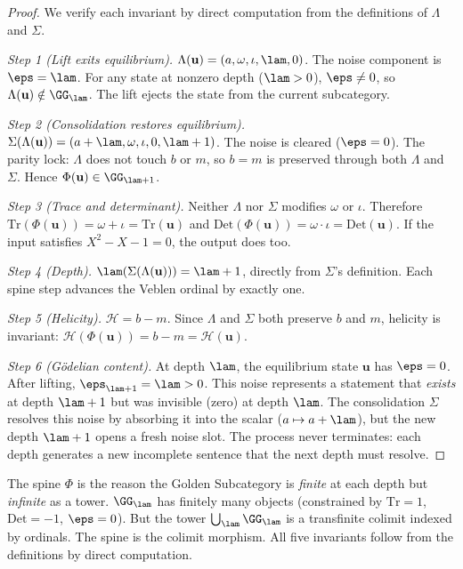 \begin{proof}
We verify each invariant by direct computation from the definitions of $\Lambda$ and $\Sigma$.

\emph{Step 1 (Lift exits equilibrium).} $\Lambda(\mathbf{u}) = (a, \omega, \iota, \lam, 0)$. The noise component is $\eps = \lam$. For any state at nonzero depth ($\lam > 0$), $\eps \neq 0$, so $\Lambda(\mathbf{u}) \notin \GG_\lam$. The lift ejects the state from the current subcategory.

\emph{Step 2 (Consolidation restores equilibrium).} $\Sigma(\Lambda(\mathbf{u})) = (a + \lam, \omega, \iota, 0, \lam + 1)$. The noise is cleared ($\eps = 0$). The parity lock: $\Lambda$ does not touch $b$ or $m$, so $b = m$ is preserved through both $\Lambda$ and $\Sigma$. Hence $\Phi(\mathbf{u}) \in \GG_{\lam+1}$.

\emph{Step 3 (Trace and determinant).} Neither $\Lambda$ nor $\Sigma$ modifies $\omega$ or $\iota$. Therefore $\mathrm{Tr}(\Phi(\mathbf{u})) = \omega + \iota = \mathrm{Tr}(\mathbf{u})$ and $\mathrm{Det}(\Phi(\mathbf{u})) = \omega \cdot \iota = \mathrm{Det}(\mathbf{u})$. If the input satisfies $X^2 - X - 1 = 0$, the output does too.

\emph{Step 4 (Depth).} $\lam(\Sigma(\Lambda(\mathbf{u}))) = \lam + 1$, directly from $\Sigma$'s definition. Each spine step advances the Veblen ordinal by exactly one.

\emph{Step 5 (Helicity).} $\mathcal{H} = b - m$. Since $\Lambda$ and $\Sigma$ both preserve $b$ and $m$, helicity is invariant: $\mathcal{H}(\Phi(\mathbf{u})) = b - m = \mathcal{H}(\mathbf{u})$.

\emph{Step 6 (G\"odelian content).} At depth $\lam$, the equilibrium state $\mathbf{u}$ has $\eps = 0$. After lifting, $\eps_{\lam+1} = \lam > 0$. This noise represents a statement that \emph{exists} at depth $\lam + 1$ but was invisible (zero) at depth $\lam$. The consolidation $\Sigma$ resolves this noise by absorbing it into the scalar ($a \mapsto a + \lam$), but the new depth $\lam + 1$ opens a fresh noise slot. The process never terminates: each depth generates a new incomplete sentence that the next depth must resolve. \qedhere
\end{proof}

\begin{remark}
The spine $\Phi$ is the reason the Golden Subcategory is \emph{finite} at each depth but \emph{infinite} as a tower. $\GG_\lam$ has finitely many objects (constrained by $\mathrm{Tr} = 1$, $\mathrm{Det} = -1$, $\eps = 0$). But the tower $\bigcup_\lam \GG_\lam$ is a transfinite colimit indexed by ordinals. The spine is the colimit morphism. All five invariants follow from the definitions by direct computation.
\end{remark}

